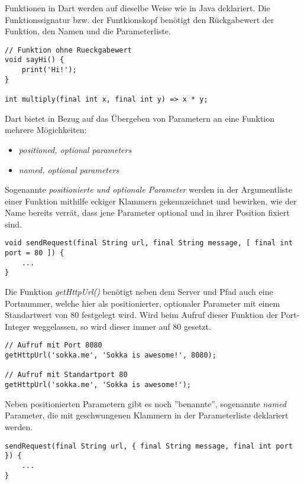 Funktionen in Dart werden auf dieselbe Weise wie in Java deklariert. Die Funktionssignatur 
bzw. der Funtkionskopf benötigt den Rückgabewert der Funktion, den Namen und die Parameterliste.

\begin{lstlisting}
// Funktion ohne Rueckgabewert
void sayHi() {
    print('Hi!');
}

int multiply(final int x, final int y) => x * y;
\end{lstlisting}

Dart bietet in Bezug auf das Übergeben von Parametern an eine Funktion mehrere Mögichkeiten:
\begin{itemize}
    \item \textit{positioned, optional parameters}
    \item \textit{named, optional parameters}
\end{itemize}

Sogenannte \textit{positionierte und optionale Parameter} werden in der Argumentliste einer Funktion
mithilfe eckiger Klammern gekennzeichnet und bewirken, wie der Name bereits verrät, dass jene Parameter
optional und in ihrer Position fixiert sind.

\begin{lstlisting}
void sendRequest(final String url, final String message, [ final int port = 80 ]) {
    ...
}
\end{lstlisting}

Die Funktion \textit{getHttpUrl()} benötigt neben dem Server und Pfad auch eine Portnummer, welche
hier als positionierter, optionaler Parameter mit einem Standartwert von 80 festgelegt wird.
Wird beim Aufruf dieser Funktion der Port-Integer weggelassen, so wird dieser immer auf 80 gesetzt.

\begin{lstlisting}
// Aufruf mit Port 8080
getHttpUrl('sokka.me', 'Sokka is awesome!', 8080);

// Aufruf mit Standartport 80
getHttpUrl('sokka.me', 'Sokka is awesome!');
\end{lstlisting}

Neben positionierten Parametern gibt es noch ''benannte'', sogenannte \textit{named} Parameter, 
die mit geschwungenen Klammern in der Parameterliste deklariert werden.\\

\begin{lstlisting}
sendRequest(final String url, { final String message, final int port }) {
    ...
}
\end{lstlisting}

